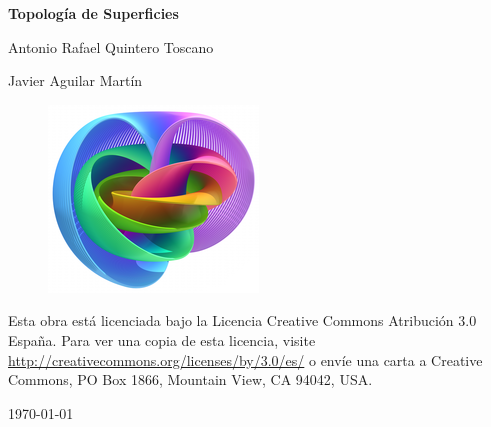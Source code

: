 \documentclass[twoside]{report}
\makeatletter
\renewcommand\tableofcontents{%
  \null\hfill\textbf{\Large\contentsname}\hfill\null\par
  \@mkboth{\MakeUppercase\contentsname}{\MakeUppercase\contentsname}%
  \@starttoc{toc}%
}
\makeatother
\begin{document}

\renewcommand\chaptername{\Huge Tema}

\titleformat{\chapter}[display]
    {\normalfont\huge\bfseries}{\chaptertitlename\ \thechapter}{10pt}{\Huge}
\titlespacing*{\chapter}{0pt}{-1cm}{10pt}


\begin{titlepage}
	\centering
	{\huge\bfseries Topología de Superficies\par}
	\vspace{2cm}
	{\Large Antonio Rafael Quintero Toscano\par}
	{\Large Javier Aguilar Martín\par}
	\vspace{2.5cm}
	\begin{figure}[h!]
		\includegraphics[scale=1.2]{Hopf_Fibration}
	\end{figure}

	\vfill
	Esta obra está licenciada bajo la Licencia Creative Commons Atribución 3.0 España. Para ver una copia de esta licencia, visite \url{http://creativecommons.org/licenses/by/3.0/es/} o envíe una carta a Creative Commons, PO Box 1866, Mountain View, CA 94042, USA.

	{\large \today\par}
\end{titlepage}

\tableofcontents







\end{document}
